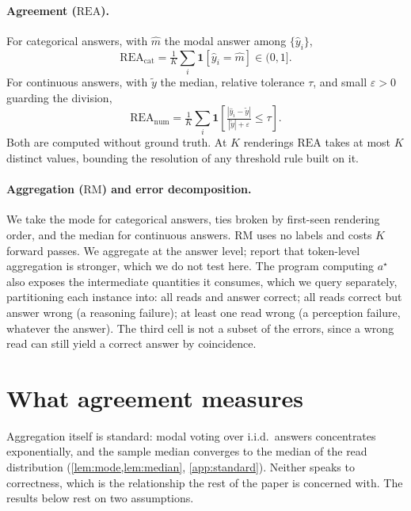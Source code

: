 \documentclass[11pt]{article}
\newcommand{\rea}{\mathrm{REA}}
\newcommand{\rmg}{\mathrm{RM}}
\begin{document}
\paragraph{Agreement ($\rea$).} For categorical answers, with $\hat m$ the modal answer among $\{\hat y_i\}$,
\begin{equation}
\rea_{\text{cat}} = \tfrac{1}{K}\textstyle\sum_{i}\mathbf{1}[\hat y_i = \hat m] \in (0,1].
\end{equation}
For continuous answers, with $\tilde y$ the median, relative tolerance $\tau$, and small $\varepsilon>0$ guarding the division,
\begin{equation}
\rea_{\text{num}} = \tfrac{1}{K}\textstyle\sum_{i}\mathbf{1}\!\left[\tfrac{|\hat y_i - \tilde y|}{|\tilde y|+\varepsilon} \le \tau\right].
\end{equation}
Both are computed without ground truth. At $K$ renderings $\rea$ takes at most $K$ distinct values, bounding the resolution of any threshold rule built on it.

\paragraph{Aggregation ($\rmg$) and error decomposition.} We take the mode for categorical answers, ties broken by first-seen rendering order, and the median for continuous answers. $\rmg$ uses no labels and costs $K$ forward passes. We aggregate at the answer level; \citet{kaya2026efficient} report that token-level aggregation is stronger, which we do not test here. The program computing $a^\star$ also exposes the intermediate quantities it consumes, which we query separately, partitioning each instance into: all reads and answer correct; all reads correct but answer wrong (a reasoning failure); at least one read wrong (a perception failure, whatever the answer). The third cell is not a subset of the errors, since a wrong read can still yield a correct answer by coincidence.

\section{What agreement measures}
\label{sec:theory}

Aggregation itself is standard: modal voting over i.i.d.\ answers concentrates exponentially, and the sample median converges to the median of the read distribution (\cref{lem:mode,lem:median}, \cref{app:standard}). Neither speaks to correctness, which is the relationship the rest of the paper is concerned with. The results below rest on two assumptions.
\end{document}
